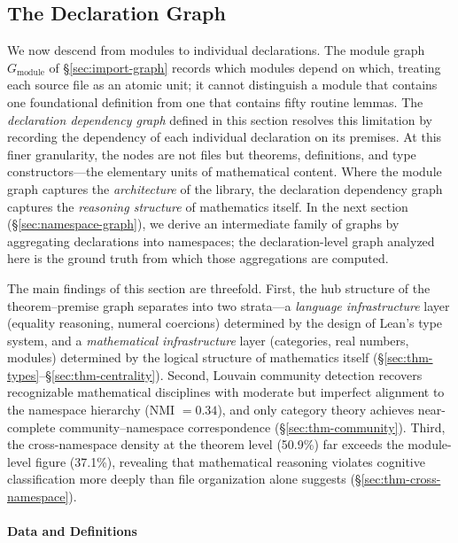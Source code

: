 \subsection{The Declaration Graph}
\label{sec:theorem-premise}

We now descend from modules to individual declarations. The module graph $G_{\mathrm{module}}$ of \S\ref{sec:import-graph} records which modules depend on which, treating each source file as an atomic unit; it cannot distinguish a module that contains one foundational definition from one that contains fifty routine lemmas. The \emph{declaration dependency graph} defined in this section resolves this limitation by recording the dependency of each individual declaration on its premises. At this finer granularity, the nodes are not files but theorems, definitions, and type constructors---the elementary units of mathematical content. Where the module graph captures the \emph{architecture} of the library, the declaration dependency graph captures the \emph{reasoning structure} of mathematics itself. In the next section (\S\ref{sec:namespace-graph}), we derive an intermediate family of graphs by aggregating declarations into namespaces; the declaration-level graph analyzed here is the ground truth from which those aggregations are computed.

The main findings of this section are threefold. First, the hub structure of the theorem--premise graph separates into two strata---a \emph{language infrastructure} layer (equality reasoning, numeral coercions) determined by the design of Lean's type system, and a \emph{mathematical infrastructure} layer (categories, real numbers, modules) determined by the logical structure of mathematics itself (\S\ref{sec:thm-types}--\S\ref{sec:thm-centrality}). Second, Louvain community detection recovers recognizable mathematical disciplines with moderate but imperfect alignment to the namespace hierarchy (NMI $= 0.34$), and only category theory achieves near-complete community--namespace correspondence (\S\ref{sec:thm-community}). Third, the cross-namespace density at the theorem level (50.9\%) far exceeds the module-level figure (37.1\%), revealing that mathematical reasoning violates cognitive classification more deeply than file organization alone suggests (\S\ref{sec:thm-cross-namespace}).

\paragraph{Data and Definitions}
\label{sec:thm-data}

